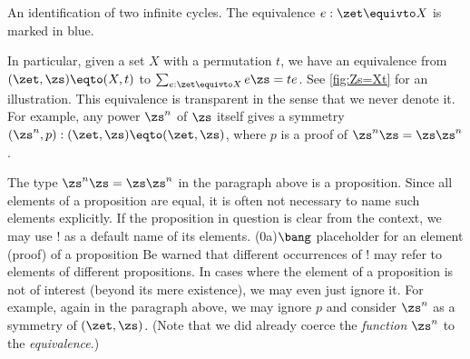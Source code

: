 \begin{marginfigure}
  \caption{An identification of two infinite cycles.
    The equivalence $e : \zet \protect\equivto X$ is marked in blue.}\label{fig:Zs=Xt}
\end{marginfigure}
In particular, given a set $X$ with a permutation $t$,
we have an equivalence from $(\zet,\zs)\eqto(X,t)$ to
$\sum_{e:\zet\equivto X}e\zs=te$. See \cref{fig:Zs=Xt} for an illustration.
This equivalence is transparent in the sense that we never denote it.
For example, any power $\zs^n$ of $\zs$ itself gives a symmetry
$(\zs^n,p) : (\zet,\zs)\eqto(\zet,\zs)$, where $p$ is a proof of
$\zs^n \zs = \zs \zs^n$.

\begin{remark}\label{rem:bang}
The type $\zs^n \zs = \zs \zs^n$ in the paragraph above is a proposition.
Since all elements of a proposition are equal, it is often not necessary
to name such elements explicitly. If the proposition in question is clear
from the context, we may use $!$ as a default name of its elements.
\glossary(0a){$\protect\bang$}%
{placeholder for an element (proof) of a proposition}
Be warned that different occurrences of $!$ may refer to elements of 
different propositions. In cases where the element of a proposition is 
not of interest (beyond its mere existence), we may even just ignore it.
For example, again in the paragraph above, we may ignore $p$ and
consider $\zs^n$ as a symmetry of $(\zet,\zs)$.
(Note that we did already coerce the \emph{function} $\zs^n$ to
the \emph{equivalence}.)
\end{remark}

